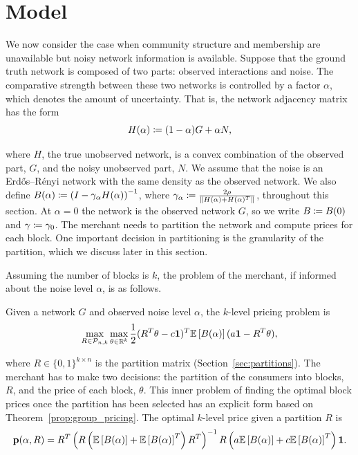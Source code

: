 \section{Model}


We now consider the case when community structure and membership are unavailable but noisy network information is available. Suppose that the ground truth network is composed of two parts: observed interactions and noise. The comparative strength between these two networks is controlled by a factor $\alpha$, which denotes the amount of uncertainty. That is, the network adjacency matrix has the form
\[ H(\alpha) \coloneqq (1-\alpha) G + \alpha N,\]


where $H$, the true unobserved network, is a convex combination of the observed part, $G$, and the noisy unobserved part, $N$. We assume that the noise is an Erd\H{o}s--R\'enyi network with the same density as the observed network. We also define $B(\alpha) \coloneqq  \left( I - \gamma_\alpha H(\alpha) \right)^{-1}$, where $\gamma_\alpha \coloneqq \frac{2\rho}{\|H(\alpha)+H(\alpha)^T\|}$, throughout this section. At $\alpha = 0$ the network is the observed network $G$, so we write $B \coloneqq B(0)$ and $\gamma \coloneqq \gamma_0$. The merchant needs to partition the network and compute prices for each block. One important decision in partitioning is the granularity of the partition, which we discuss later in this section.


Assuming the number of blocks is $k$, the problem of the merchant, if informed about the noise level $\alpha$, is as follows.
\begin{definition}\label{def:klevel}
    Given a network $G$ and observed noise level $\alpha$, the $k$-level pricing problem is
     \[ \max_{R \in \mathcal{P}_{n,k} } \max_{\theta \in \mathbb{R}^k} \frac{1}{2} ( R^T \theta - c\mathbf{1})^T \mathbb{E}\left[ B(\alpha)\right] (a\mathbf{1} - R^T \theta ),\]
\end{definition}
where $R \in {\{0,1\}}^{k \times n}$ is the partition matrix (Section~\ref{sec:partitions}). The merchant has to make two decisions: the partition of the consumers into blocks, $R$, and the price of each block, $\theta$. This inner problem of finding the optimal block prices once the partition has been selected has an explicit form based on Theorem~\ref{prop:group_pricing}. The optimal $k$-level price given a partition $R$ is \[  \mathbf{p}(\alpha,R) = R^T \left( R \left(\mathbb{E}\left[ B(\alpha)\right] + \mathbb{E}\left[ B(\alpha)\right]^T \right) R^T \right)^{-1} R \left( a \mathbb{E}\left[ B(\alpha)\right] + c\mathbb{E}\left[ B(\alpha)\right]^T \right) \mathbf{1}. \]

